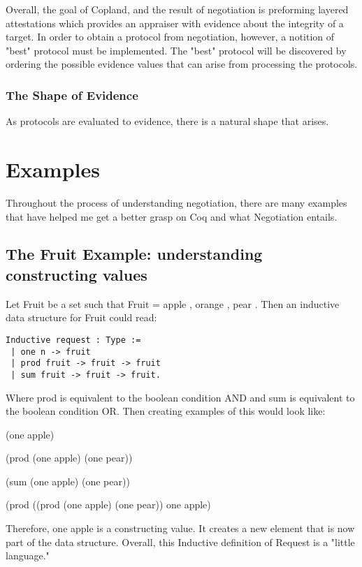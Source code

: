 \documentclass[10pt]{report}
\begin{document}
Overall, the goal of Copland, and the result of negotiation is preforming
layered attestations which provides
an appraiser with evidence about the integrity of a target. In order to obtain
a protocol from negotiation, however, a notition of "best" protocol must
be implemented. The "best" protocol will be discovered by ordering the
possible evidence values that can arise from processing the protocols. 

\subsection{The Shape of Evidence}

As protocols are evaluated to evidence, there is a natural shape that
arises.

\chapter{Examples}

Throughout the process of understanding negotiation, there are many
examples that have helped me get a better grasp on Coq and what Negotiation
entails. 

\section{The Fruit Example: understanding constructing values}

Let Fruit be a set such that Fruit = { apple , orange , pear }. Then an
inductive data structure for Fruit could read:  

\begin{verbatim}
Inductive request : Type := 
 | one n -> fruit
 | prod fruit -> fruit -> fruit
 | sum fruit -> fruit -> fruit.
\end{verbatim}

Where prod is equivalent to the boolean condition AND and sum is equivalent
to the boolean condition OR. Then creating examples of this would look like: 


(one apple)

(prod (one apple) (one pear))

(sum (one apple) (one pear))

(prod ((prod (one apple) (one pear)) one apple)


Therefore, one apple is a constructing value. It creates a new element that is
now part of the data structure. Overall, this Inductive definition of Request
is a "little language."
\end{document}
